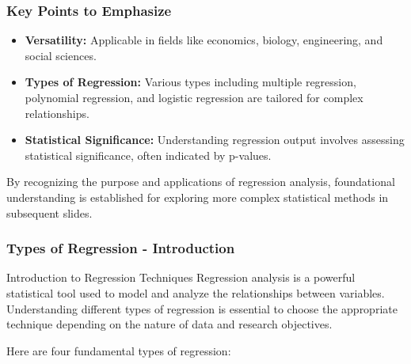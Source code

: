 \documentclass{beamer}
\begin{document}
\begin{frame}[fragile]
    \frametitle{Key Points to Emphasize}
    
    \begin{itemize}
        \item \textbf{Versatility:} Applicable in fields like economics, biology, engineering, and social sciences.
        \item \textbf{Types of Regression:} Various types including multiple regression, polynomial regression, and logistic regression are tailored for complex relationships.
        \item \textbf{Statistical Significance:} Understanding regression output involves assessing statistical significance, often indicated by p-values.
    \end{itemize}
    
    By recognizing the purpose and applications of regression analysis, foundational understanding is established for exploring more complex statistical methods in subsequent slides.
\end{frame}

\begin{frame}[fragile]
    \frametitle{Types of Regression - Introduction}
    \begin{block}{Introduction to Regression Techniques}
        Regression analysis is a powerful statistical tool used to model and analyze the relationships between variables. 
        Understanding different types of regression is essential to choose the appropriate technique depending on the nature of data and research objectives.
    \end{block}
    
    Here are four fundamental types of regression:
\end{frame}
\end{document}
